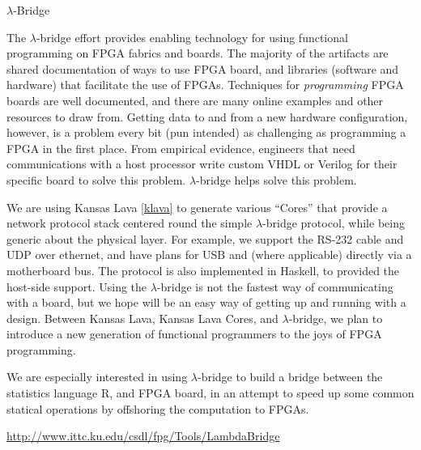 \begin{hcarentry}{$\lambda$-Bridge}
\label{lambdabridge}
\makeheader

The $\lambda$-bridge effort provides enabling technology for using functional
programming on FPGA fabrics and boards. The majority of the artifacts are
shared documentation of ways to use FPGA board, and libraries (software and
hardware) that facilitate the use of FPGAs.
Techniques for {\em programming\/} FPGA boards are well documented, and there
are many online examples and other resources to draw from. Getting data to and
from a new hardware configuration, however, is a problem every bit (pun
intended) as challenging as programming a FPGA in the first place. From
empirical evidence, engineers that need communications with a host processor
write custom VHDL or Verilog for their specific board to solve this problem.
$\lambda$-bridge helps solve this problem.

We are using Kansas Lava \cref{klava} to generate various ``Cores'' that provide
a network protocol stack centered
round the simple $\lambda$-bridge protocol, while being generic
about the physical layer.
For example, we support the RS-232 cable and UDP over ethernet, 
and have plans for USB and (where applicable) directly via a motherboard bus. 
The protocol is also implemented in Haskell, to provided the host-side
support.
Using the $\lambda$-bridge is not the fastest way of communicating
with a board, but we hope will be an easy way of getting up and running
with a design.
Between Kansas Lava, Kansas Lava Cores, and $\lambda$-bridge, we plan
to introduce a new generation of functional programmers to the joys
of FPGA programming.

We are especially interested in using $\lambda$-bridge to build
a bridge between the statistics language R, and FPGA board,
in an attempt to speed up some common statical operations
by offshoring the computation to FPGAs.

\FurtherReading
  \url{http://www.ittc.ku.edu/csdl/fpg/Tools/LambdaBridge}
\end{hcarentry}
